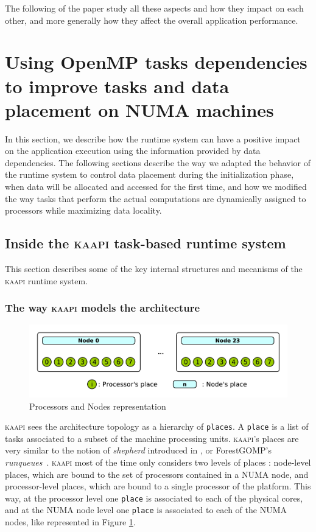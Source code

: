 \documentclass{Styles/llncs}
\newcommand{\kaapi}{\textsc{\mbox{kaapi}}\xspace}
\begin{document}
The following of the paper study all these aspects and how they impact on each other, and more generally how they affect the overall application performance.

\section{Using OpenMP tasks dependencies to improve tasks and data
  placement on NUMA machines}

In this section, we describe how the runtime system can have a positive impact on the application execution using the information provided by data dependencies.
The following sections describe the way we adapted the behavior of the runtime system to control data placement during the initialization phase, when data will be allocated and accessed for the first time, and how we modified the way tasks that perform the actual computations are dynamically assigned to processors while maximizing data locality.


\subsection{Inside the \kaapi task-based runtime system}

This section describes some of the key internal structures and mecanisms of the \kaapi runtime system.

\subsubsection{The way \kaapi models the architecture}

\begin{figure}[t]
  \centering
  \includegraphics[scale=0.5]{./figures/topology.pdf}
\caption{Processors and Nodes representation}
\label{fig:detail-topology}
\end{figure}

\kaapi sees the architecture topology as a hierarchy of \verb/places/.
A \verb/place/ is a list of tasks associated to a subset of the machine processing units.
\kaapi's places are very similar to the notion of \emph{shepherd} introduced in \cite{DBLP:journals/ijhpca/OlivierPWSP12}, or ForestGOMP's \emph{runqueues}~\cite{BroFurGogWacNam10IJPP}.
\kaapi most of the time only considers two levels of places : node-level places, which are bound to the set of processors contained in a NUMA node, and processor-level places, which are bound to a single processor of the platform.
This way, at the processor level one \verb/place/ is associated to each of the physical cores, and
at the NUMA node level one \verb/place/ is associated to each of the NUMA nodes, like represented in
Figure \ref{fig:detail-topology}.
\end{document}
